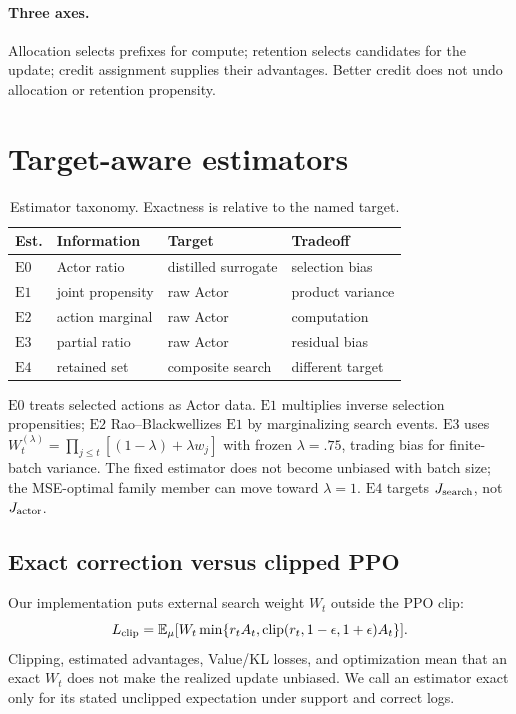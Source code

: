 \documentclass[10pt]{article}
\newcommand{\Ezero}{\ensuremath{\mathrm{E0}}}
\newcommand{\Eone}{\ensuremath{\mathrm{E1}}}
\newcommand{\Etwo}{\ensuremath{\mathrm{E2}}}
\newcommand{\Ethree}{\ensuremath{\mathrm{E3}}}
\newcommand{\Efour}{\ensuremath{\mathrm{E4}}}
\begin{document}
\paragraph{Three axes.}
Allocation selects prefixes for compute; retention selects candidates for the
update; credit assignment supplies their advantages. Better credit does not
undo allocation or retention propensity.

\section{Target-aware estimators}
\begin{table}[t]
\caption{Estimator taxonomy. Exactness is relative to the named target.}
\label{tab:estimators}\centering\small
\begin{tabular}{llll}\toprule
Est. & Information & Target & Tradeoff\\\midrule
\Ezero & Actor ratio & distilled surrogate & selection bias\\
\Eone & joint propensity & raw Actor & product variance\\
\Etwo & action marginal & raw Actor & computation\\
\Ethree & partial ratio & raw Actor & residual bias\\
\Efour & retained set & composite search & different target\\\bottomrule
\end{tabular}
\end{table}
\Ezero{} treats selected actions as Actor data. \Eone{} multiplies inverse
selection propensities; \Etwo{} Rao--Blackwellizes \Eone{} by marginalizing
search events. \Ethree{} uses
\(W_t^{(\lambda)}=\prod_{j\le t}[(1-\lambda)+\lambda w_j]\) with frozen
\(\lambda=.75\), trading bias for finite-batch variance. The fixed estimator
does not become unbiased with batch size; the MSE-optimal family member can
move toward \(\lambda=1\). \Efour{} targets \(J_{\rm search}\), not
\(J_{\rm actor}\).

\subsection{Exact correction versus clipped PPO}
Our implementation puts external search weight \(W_t\) outside the PPO clip:
\begin{equation}
L_{\rm clip}=\mathbb E_\mu[W_t\min\{r_tA_t,
\operatorname{clip}(r_t,1-\epsilon,1+\epsilon)A_t\}].
\label{eq:clipped-surrogate}
\end{equation}
Clipping, estimated advantages, Value/KL losses, and optimization mean that an
exact \(W_t\) does not make the realized update unbiased. We call an estimator
exact only for its stated unclipped expectation under support and correct logs.
\end{document}
